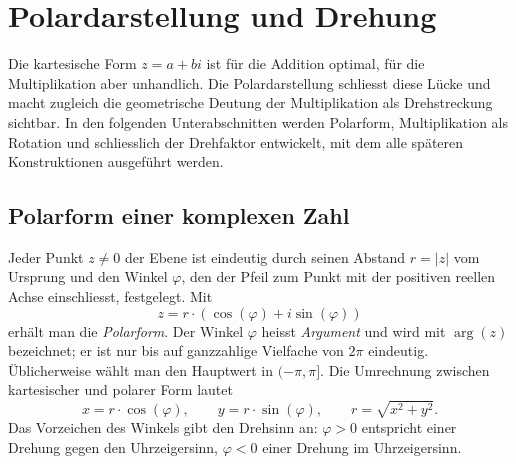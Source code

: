 %
%
\section{Polardarstellung und Drehung
\label{komplex:section:polar}}
Die kartesische Form $z = a + bi$ ist für die Addition optimal,
für die Multiplikation aber unhandlich.
Die Polardarstellung schliesst diese Lücke
und macht zugleich die geometrische Deutung der Multiplikation als
Drehstreckung sichtbar.
In den folgenden Unterabschnitten werden Polarform, Multiplikation als
Rotation und schliesslich der Drehfaktor entwickelt,
mit dem alle späteren Konstruktionen ausgeführt werden.

%
%
\subsection{Polarform einer komplexen Zahl
\label{komplex:subsection:polarform}}
Jeder Punkt $z \neq 0$ der Ebene ist eindeutig durch seinen Abstand
$r = |z|$ vom Ursprung
und den Winkel $\varphi$, den der Pfeil zum Punkt mit der positiven reellen
Achse einschliesst, festgelegt.
Mit
\begin{equation}
z
=
r \cdot ( \cos(\varphi) + i \sin(\varphi) )
\label{komplex:eq:polarform}
\end{equation}
erhält man die \emph{Polarform}.
%
Der Winkel $\varphi$ heisst \emph{Argument} und wird mit $\arg(z)$
%
bezeichnet;
er ist nur bis auf ganzzahlige Vielfache von $2\pi$ eindeutig.
Üblicherweise wählt man den Hauptwert in $(-\pi, \pi]$.
Die Umrechnung zwischen kartesischer und polarer Form lautet
\begin{equation}
x = r \cdot \cos(\varphi) ,
\qquad
y = r \cdot \sin(\varphi) ,
\qquad
r = \!\sqrt{x^2 + y^2} .
\label{komplex:eq:umrechnung}
\end{equation}
Das Vorzeichen des Winkels gibt den Drehsinn an:
$\varphi > 0$ entspricht einer Drehung gegen den Uhrzeigersinn,
$\varphi < 0$ einer Drehung im Uhrzeigersinn.

%
%
